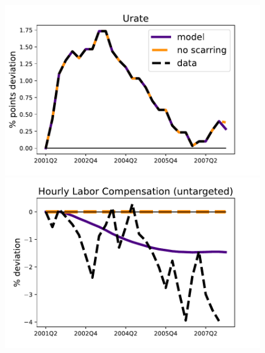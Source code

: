 \begin{figure}[H] %
\centering
\begin{minipage}{0.51\textwidth}
\includegraphics[scale=.57]{text/chapter1/Figures/2000s/Urate_00s}
\end{minipage}\hspace*{\fill}
\begin{minipage}{0.51\textwidth}
\includegraphics[scale=.57]{text/chapter1/Figures/2000s/hourly_comp_00s}
\end{minipage}


\end{figure}
